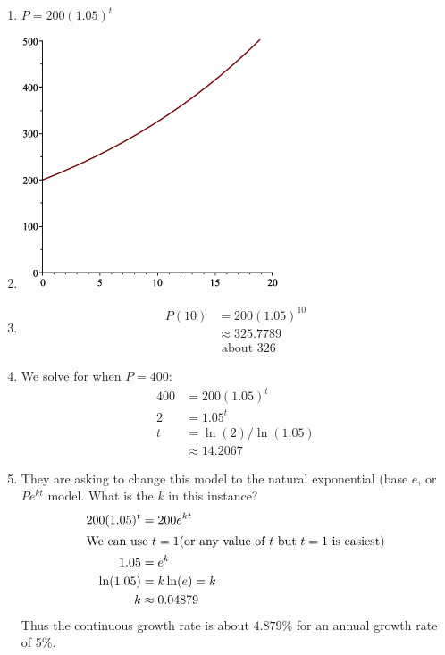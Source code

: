 \documentclass[oneside]{book}
\theoremstyle{definition}
\theoremstyle{solution}
\newtheorem*{solution}{Solution}
\newenvironment{solution}{\vspace{2in}\comment}{\endcomment}
\begin{document}
\begin{solution}
\begin{enumerate}
\item $P = 200(1.05)^t$
\item 
\begin{center}
\includegraphics[width=3in]{city_population_growth}
\end{center}

\item \begin{align*}
P(10) & = 200(1.05)^{10}\\
& \approx 325.7789\\
& \boxed{\text{ about }326}
\end{align*}

\item We solve for when $P=400$:
\begin{align*}
 400 & = 200(1.05)^t \\
 2 & = 1.05^t\\
 t & = \ln(2)/\ln(1.05) \\
  & \approx 14.2067 
\end{align*}

\item They are asking to change this model to the natural exponential
  (base $e$, or $Pe^{kt}$ model.  What is the $k$ in this instance?
  \begin{align*}
    200(1.05)^t & = 200e^{kt}\\
    \intertext{We can use $t = 1$(or any value of $t$ but $t=1$ is easiest)}
    1.05 & = e^{k}\\
    \ln(1.05) & = k \ln(e) = k\\
    k & \approx 0.04879
  \end{align*}
  Thus the continuous growth rate is about $4.879\%$ for an annual
  growth rate of 5\%.


\end{enumerate}
\end{solution}
\end{document}
